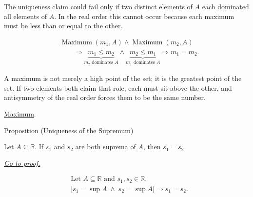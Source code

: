 \begin{remark*}
The uniqueness claim could fail only if two distinct elements of $A$ each dominated all elements of $A$. In the real order this cannot occur because each maximum must be less than or equal to the other.
\end{remark*}

\begin{remark*}
\[
\begin{aligned}
&\operatorname{Maximum}(m_1,A)\land \operatorname{Maximum}(m_2,A)\\
&\qquad\Longrightarrow
\underbrace{m_1\le m_2}_{m_2\text{ dominates }A}
\land
\underbrace{m_2\le m_1}_{m_1\text{ dominates }A}
\Longrightarrow
m_1=m_2.
\end{aligned}
\]
\end{remark*}

\begin{remark*}[Interpretation]
A maximum is not merely a high point of the set; it is the greatest point of the set. If two elements both claim that role, each must sit above the other, and antisymmetry of the real order forces them to be the same number.
\end{remark*}

\begin{dependencies}
\hyperref[def:maximum]{Maximum}.
\end{dependencies}


\begin{propositionbox}{Proposition (Uniqueness of the Supremum)}
\begin{proposition}
\label{prop:uniqueness-of-the-supremum}
Let $A\subseteq\mathbb{R}$. If $s_1$ and $s_2$ are both suprema of $A$, then $s_1=s_2$.

\smallskip
\noindent
\hyperref[prf:uniqueness-of-the-supremum]{\textit{Go to proof.}}
\end{proposition}
\end{propositionbox}

\begin{remark*}
\[
\begin{aligned}
&\text{Let }A\subseteq\mathbb{R}\text{ and }s_1,s_2\in\mathbb{R}.\\
&\bigl[s_1=\sup A\;\land\;s_2=\sup A\bigr]
\Longrightarrow
s_1=s_2.
\end{aligned}
\]
\end{remark*}

